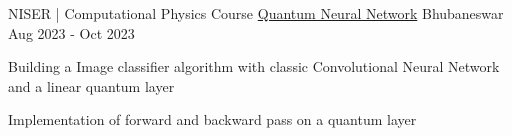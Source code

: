 \begin{cventries}

\cventry
{NISER | Computational Physics Course} %
{\href{https://github.com/pritipriya-dasbehera/QNN_CP}{Quantum Neural Network}} %
{Bhubaneswar} %
{Aug 2023 - Oct 2023} %
{
	\begin{cvitems} %
		\item {Building a Image classifier algorithm with classic Convolutional Neural Network and a linear quantum layer}
		\item {Implementation of forward and backward pass on a quantum layer}\\
	\end{cvitems}
}


\end{cventries}
